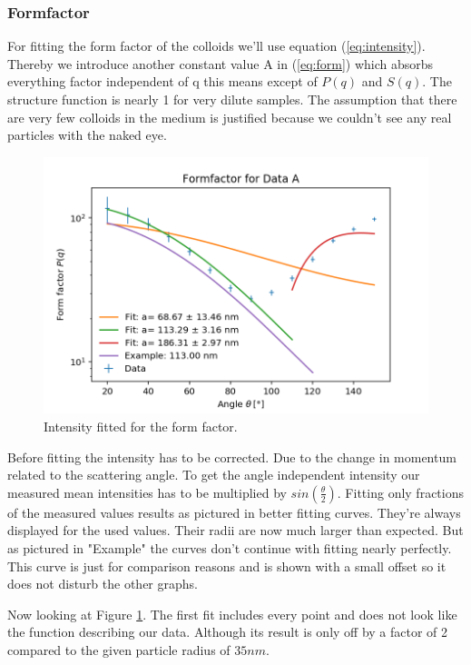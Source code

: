 \documentclass[]{article}
\begin{document}
\subsubsection{Formfactor}

For fitting the form factor of the colloids we'll use equation (\ref{eq:intensity}). Thereby we introduce another constant value A in (\ref{eq:form}) which absorbs everything factor independent of q this means except of $P(q)$ and $S(q)$. The structure function is nearly 1 for very dilute samples. The assumption that there are very few colloids in the medium is justified because we couldn't see any real particles with the naked eye. 

\begin{figure}[!htbp]
\centering
\includegraphics[width=0.8\linewidth]{Plots/FormA.png}
\caption{Intensity fitted for the form factor.}
\label{FormA}
\end{figure}

Before fitting the intensity has to be corrected. Due to the change in momentum related to the scattering angle. To get the angle independent intensity our measured mean intensities has to be multiplied by $sin(\frac{\theta}{2} )$.
Fitting only fractions of the measured values results as pictured in better fitting curves. They're always displayed for the used values. Their radii are now much larger than expected. But as pictured in "Example" the curves don't continue with fitting nearly perfectly. This curve is just for comparison reasons and is shown with a small offset so it does not disturb the other graphs.

Now looking at Figure \ref{FormA}. The first fit includes every point and does not look like the function describing our data. Although its result is only off by a factor of 2 compared to the given particle radius of $35nm$. 
\end{document}
